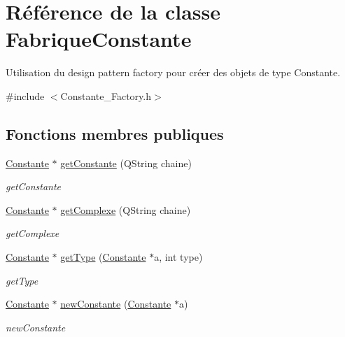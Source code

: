 \hypertarget{class_fabrique_constante}{\section{Référence de la classe Fabrique\-Constante}
\label{class_fabrique_constante}
}


Utilisation du design pattern factory pour créer des objets de type Constante.  




{\ttfamily \#include $<$Constante\-\_\-\-Factory.\-h$>$}

\subsection*{Fonctions membres publiques}
\begin{DoxyCompactItemize}
\item 
\hyperlink{class_calcul_1_1_constante}{Constante} $\ast$ \hyperlink{class_fabrique_constante_a7d192cf62b0c19f17d0ebdb8dac371ab}{get\-Constante} (Q\-String chaine)
\begin{DoxyCompactList}\small\item\em get\-Constante \end{DoxyCompactList}\item 
\hyperlink{class_calcul_1_1_constante}{Constante} $\ast$ \hyperlink{class_fabrique_constante_a05259a5b19903d8f1b640e45621d1fd4}{get\-Complexe} (Q\-String chaine)
\begin{DoxyCompactList}\small\item\em get\-Complexe \end{DoxyCompactList}\item 
\hyperlink{class_calcul_1_1_constante}{Constante} $\ast$ \hyperlink{class_fabrique_constante_a432cc65aa3d80402ea017963d5c06edf}{get\-Type} (\hyperlink{class_calcul_1_1_constante}{Constante} $\ast$a, int type)
\begin{DoxyCompactList}\small\item\em get\-Type \end{DoxyCompactList}\item 
\hyperlink{class_calcul_1_1_constante}{Constante} $\ast$ \hyperlink{class_fabrique_constante_aa1f4a720e896aaeabd85b0dc042c2ecf}{new\-Constante} (\hyperlink{class_calcul_1_1_constante}{Constante} $\ast$a)
\begin{DoxyCompactList}\small\item\em new\-Constante \end{DoxyCompactList}\end{DoxyCompactItemize}


